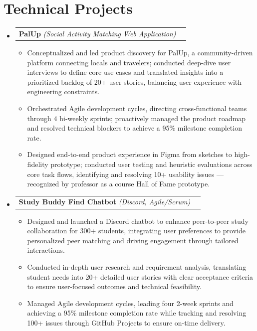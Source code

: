 \documentclass[letterpaper,10pt]{article}
\makeatletter
\newcommand{\resumeItem}[1]{\item\small{{#1\vspace{-2pt}}}}
\newcommand{\resumeProjectHeading}[2]{
  \item\begin{tabular*}{0.97\textwidth}{l@{\extracolsep{\fill}}r}
    \small#1 & #2 \\
  \end{tabular*}\vspace{-7pt}}
\newcommand{\resumeSubHeadingListStart}{\begin{itemize}[leftmargin=0.15in,label={}]}
\newcommand{\resumeSubHeadingListEnd}{\end{itemize}}
\newcommand{\resumeItemListStart}{\begin{itemize}}
\newcommand{\resumeItemListEnd}{\end{itemize}\vspace{-7pt}}
\makeatother
\begin{document}
\section{Technical Projects}
\resumeSubHeadingListStart
  \resumeProjectHeading{\textbf{PalUp} \emph{(Social Activity Matching Web Application)}}{}
  \resumeItemListStart
    \resumeItem{Conceptualized and led product discovery for PalUp, a community-driven platform connecting locals and travelers; conducted deep-dive user interviews to define core use cases and translated insights into a prioritized backlog of 20+ user stories, balancing user experience with engineering constraints.}
    \resumeItem{Orchestrated Agile development cycles, directing cross-functional teams through 4 bi-weekly sprints; proactively managed the product roadmap and resolved technical blockers to achieve a 95\% milestone completion rate.}
    \resumeItem{Designed end-to-end product experience in Figma from sketches to high-fidelity prototype; conducted user testing and heuristic evaluations across core task flows, identifying and resolving 10+ usability issues --- recognized by professor as a course Hall of Fame prototype.}
  \resumeItemListEnd

  \resumeProjectHeading{\textbf{Study Buddy Find Chatbot} \emph{(Discord, Agile/Scrum)}}{}
  \resumeItemListStart
    \resumeItem{Designed and launched a Discord chatbot to enhance peer-to-peer study collaboration for 300+ students, integrating user preferences to provide personalized peer matching and driving engagement through tailored interactions.}
    \resumeItem{Conducted in-depth user research and requirement analysis, translating student needs into 20+ detailed user stories with clear acceptance criteria to ensure user-focused outcomes and technical feasibility.}
    \resumeItem{Managed Agile development cycles, leading four 2-week sprints and achieving a 95\% milestone completion rate while tracking and resolving 100+ issues through GitHub Projects to ensure on-time delivery.}
  \resumeItemListEnd
\resumeSubHeadingListEnd
\end{document}
